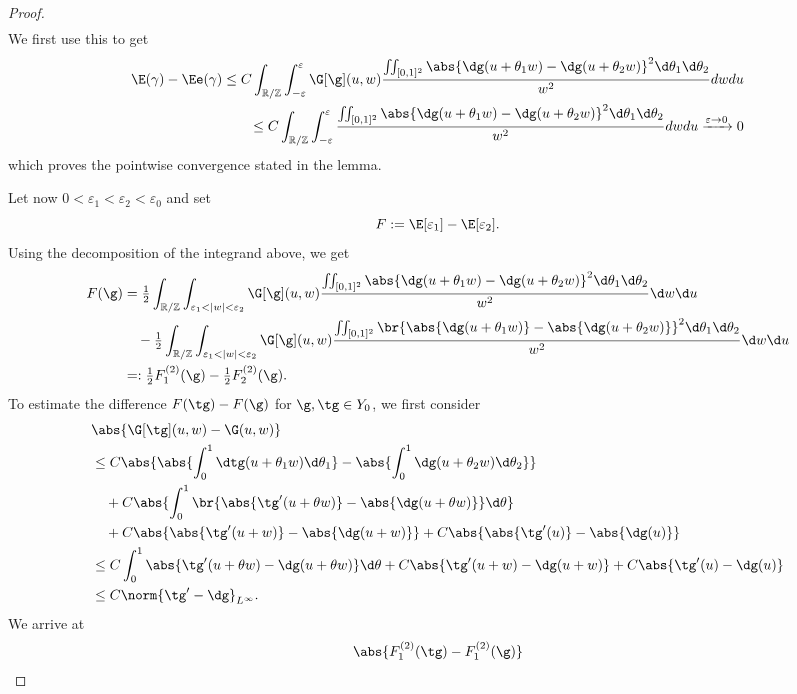 \begin{proof}
\begin{align*}
 \end{align*}
 We first use this to get
 \begin{align*}
  \E(\gamma) - \Ee(\gamma) \leq C \int_{\mathbb R / \mathbb Z} \int_{-\varepsilon}^\varepsilon
  \G[\g](u,w)\frac{\iint_{[0,1]^2}\abs{\dg(u+\theta_1w)-\dg(u+\theta_2w)}^2\d\theta_1\d\theta_2}{w^2} 
  dw du  \\
  \leq C  \int_{\mathbb R / \mathbb Z} \int_{-\varepsilon}^\varepsilon
  \frac{\iint_{[0,1]^2}\abs{\dg(u+\theta_1w)-\dg(u+\theta_2w)}^2\d\theta_1\d\theta_2}{w^2} 
  dw du 
  \xrightarrow{\varepsilon \rightarrow 0} 0 
 \end{align*}
 which proves the pointwise convergence stated in the lemma.

 Let now $0<\varepsilon_1 < \varepsilon_2 < \varepsilon_0$ and set
 \[ F:= \E[\varepsilon_1] - \E[\varepsilon_2]. \]
 Using the decomposition of the integrand above, we get 
 \begin{align*}
  F(\g) &=  \tfrac12 \int_{\mathbb R / \mathbb Z}
  \int_{\varepsilon_1 < |w| < \varepsilon_2}\G[\g](u,w)\frac{\iint_{[0,1]^2}\abs{\dg(u+\theta_1w)-\dg(u+\theta_2w)}^2\d\theta_1\d\theta_2}{w^2}\d w\d u \\
  &\quad{}-\tfrac12  \int_{\mathbb R / \mathbb Z}
  \int_{\varepsilon_1 < |w| < \varepsilon_2}\G[\g](u,w)\frac{\iint_{[0,1]^2}\br{\abs{\dg(u+\theta_1w)}-\abs{\dg(u+\theta_2w)}}^2\d\theta_1\d\theta_2}{w^2}\d w\d u \\
  &=: \tfrac12 F_1^{(2)}(\g) - \tfrac12 F_2^{(2)}(\g).
 \end{align*}
 To estimate the difference $F(\gt)-F(\g)$ for $\g,\tg\in Y_{0}$, we first consider
 \begin{align*}
  &\abs{\G[\gt](u,w)-\G(u,w)} \\
  &\le C\abs{\abs{\int_0^1\dtg(u+\theta_1w)\d\theta_1}-\abs{\int_0^1\dg(u+\theta_2w)\d\theta_2}}
  \\
  & \quad{}+C\abs{\int_0^1\br{\abs{\dgt(u+\theta w)}-\abs{\dg(u+\theta w)}}\d\theta} \\
  &\quad{}+C\abs{\abs{\dgt(u+w)}-\abs{\dg(u+w)}} +C\abs{\abs{\dgt(u)}-\abs{\dg(u)}} \\
  &\le C\int_0^1\abs{\dgt(u+\theta w)-\dg(u+\theta w)}\d\theta +C\abs{{\dgt(u+w)}-{\dg(u+w)}} +C\abs{{\dgt(u)}-{\dg(u)}} \\
  &\le C\norm{\dgt-\dg}_{L^\infty}.
 \end{align*}
 We arrive at
 \begin{align*}
  &\abs{F_1^{(2)}(\gt)-F_1^{(2)}(\g)} \\

\end{align*}
\end{proof}
